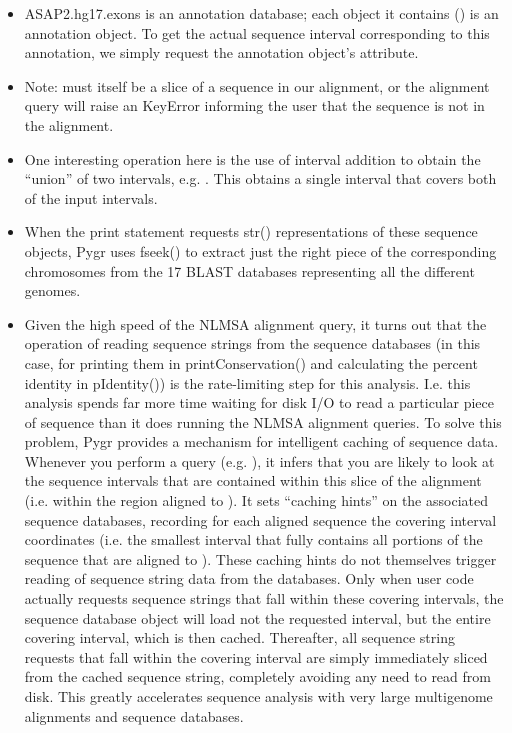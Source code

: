 \documentclass{howto}
\begin{document}
\begin{itemize}
\item ASAP2.hg17.exons is an annotation database; each object it
contains () is an annotation object.  To get the actual
sequence interval corresponding to this annotation, we simply request
the annotation object's  attribute.

\item
Note:  must itself be a slice of a sequence in our alignment, 
or the alignment query  will raise an KeyError informing
the user that the sequence  is not in the alignment.

\item
One interesting operation here is the use of interval
addition to obtain the ``union'' of two intervals, e.g. .
This obtains a single interval that covers both of the input intervals.

\item
When the print  statement requests str() representations of these sequence objects, Pygr uses fseek() to extract just the right piece of the corresponding chromosomes from the 17 BLAST databases representing all the different genomes.

\item
Given the high speed of the NLMSA alignment query, it turns out that the
operation of reading sequence strings from the sequence databases (in this
case, for printing them in printConservation() and calculating the percent identity
in pIdentity()) is the rate-limiting step for this analysis.  I.e. this analysis
spends far more time waiting for disk I/O to read a particular piece of sequence 
than it does running the NLMSA alignment queries.  To solve this problem, Pygr
provides a mechanism for intelligent caching of sequence data.  Whenever you
perform a query (e.g. ), it infers that you are likely to look
at the sequence intervals that are contained within this slice of the alignment
(i.e. within the region aligned to ).  It sets ``caching hints'' on the
associated sequence databases, recording for each aligned sequence
the covering interval coordinates (i.e. the smallest interval that fully contains
all portions of the sequence that are aligned to ).  These caching hints
do not themselves trigger reading of sequence string data from the databases.  Only
when user code actually requests sequence strings that fall within these covering
intervals, the sequence database object will load not the requested interval, but
the entire covering interval, which is then cached.  Thereafter, all sequence
string requests that fall within the covering interval are simply immediately sliced
from the cached sequence string, completely avoiding any need to read from disk.
This greatly accelerates sequence analysis with very large multigenome alignments
and sequence databases.  


\end{itemize}
\end{document}
